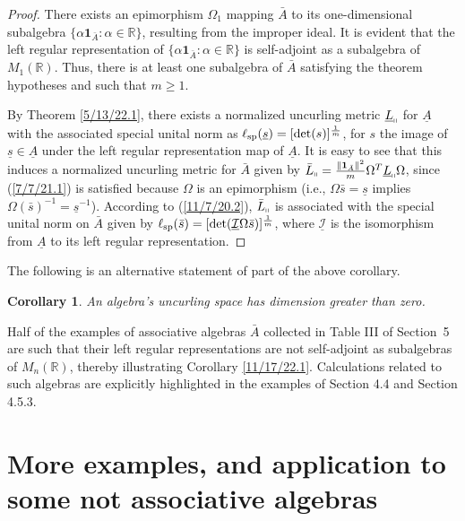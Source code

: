 \documentclass{amsart}
\numberwithin{equation}{section}
\newtheorem{corollary}[theorem]{Corollary}
\theoremstyle{definition}
\numberwithin{theorem}{section}
\begin{document}
  \begin{proof}   There exists an epimorphism $\Omega_1$ mapping $\bar{A}$  to its one-dimensional subalgebra $\{\alpha\mathbf{1}_{\bar{A}}:\alpha\in\mathbb{R}\}$, resulting from the improper ideal.   It is evident that the left regular representation of  $\{\alpha\mathbf{1}_{\bar{A}}:\alpha\in\mathbb{R}\}$ is self-adjoint as a subalgebra of $M_1(\mathbb{R})$. Thus, there is at least one subalgebra of $\bar{A}$ satisfying the theorem hypotheses and such that $m\ge 1$.  
  
  By Theorem \ref{5/13/22.1}, there exists a normalized uncurling metric $\underline{L}_{\shortparallel}$ for $\underline{A}$ with the associated special unital norm as $\ell_{\rm sp}(\underline{s}) =  [\text{det}(s)]^\frac{1}{m}$, for $s$ the image of $\underline{s}\in\underline{A}$ under the left regular representation map of $\underline{A}$.  It is easy to see that this induces a normalized uncurling metric for $\bar{A}$ given by $\bar{L}_{\shortparallel} = \frac{\|\mathbf{1}_{\bar{A}}\|^2}{m} \Omega^T \underline{L}_{\shortparallel} \Omega$, since (\ref{7/7/21.1}) is satisfied because $\Omega$ is an epimorphism (i.e., $\Omega\bar{s} =  \underline{s}$ implies $\Omega(\bar{s})^{-1} =  \underline{s}^{-1}$).  According to (\ref{11/7/20.2}), $\bar{L}_{\shortparallel}$ is associated with the special unital norm on $\bar{A}$ given by $\ell_{\rm sp}(\bar{s}) = [\text{det}(\underline{\mathcal{I}}\Omega\bar{s})]^{\frac{1}{m}}$, where $\underline{\mathcal{I}}$ is the isomorphism from $\underline{A}$ to its left regular representation. 
  \end{proof}
  
   

 The following is an alternative statement of part of the above corollary.   
 
 \begin{corollary}\label{1/1/23.1} An algebra's uncurling space has dimension greater than zero. \end{corollary}
  
Half of the examples of associative algebras $\bar{A}$ collected in Table III of \mbox{Section 5} are such that their left regular representations are not self-adjoint as subalgebras of $M_n(\mathbb{R})$, thereby illustrating Corollary \ref{11/17/22.1}.  Calculations related to such algebras are explicitly highlighted in the examples of Section 4.4 and Section 4.5.3.

\section{More examples, and application to some not associative algebras}
\end{document}
